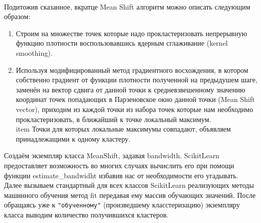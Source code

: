 \documentclass[11pt]{article}
\begin{document}
    \begin{center}
    \end{center}
    { \hspace*{\fill} \\}
    
    Подитожив сказанное, вкратце Mean Shift алгоритм можно описать следующим
образом:

\begin{enumerate}
\item Строим на множестве точек которые надо прокластеризовать непрерывную функцию плотности воспользовавшись ядерным сглаживание (kernel smoothing).
\item Используя модифицированный метод градиентного восхождения, в котором собственно градиент от функции плотности полученной на предыдушем шаге, заменён на вектор сдвига от данной точки к средневзвешенному значению координат точек попадающих в Парзеновское окно данной точки (Mean Shift vector), приходим из каждой точки из набора точек которые нам необходимо прокластеризовать, в ближайший к точке локальный максимум.
\\item Точки для которых локальные максимумы совпадают, объявляем принадлежащими к одному кластеру.
\end{enumerate}

    Создаём экземпляр класса MeanShift, задавая bandwidth. ScikitLearn
предоставляет возможность во многих случаях вычислить его при помощи
функции estimate\_bandwidht избавив нас от необходимости его угадывать.
Далее вызываем стандартный для всех классов ScikitLearn реализующих
методы машинного обучения метод fit передавая ему массив обучающих
значений. После обращаясь уже к \verb'"обученному"' (произведшему
класстеризацию) экземпляру класса выводим количество получившихся
кластеров.
\end{document}
